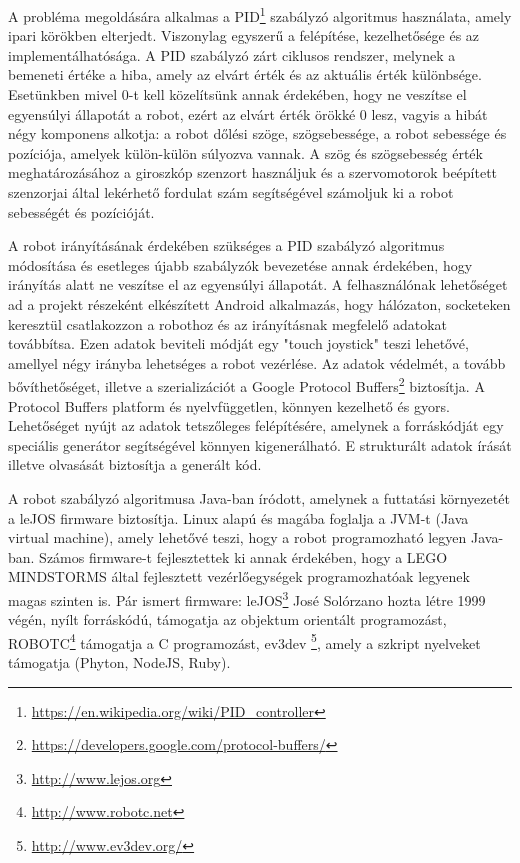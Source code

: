 A probléma megoldására alkalmas a PID\footnote{\href{https://en.wikipedia.org/wiki/PID\_controller}{https://en.wikipedia.org/wiki/PID\_controller}} szabályzó algoritmus használata, amely ipari körökben elterjedt. Viszonylag egyszerű a felépítése, kezelhetősége és az implementálhatósága. A PID szabályzó zárt ciklusos rendszer, melynek a bemeneti értéke a hiba, amely az elvárt érték és az aktuális érték különbsége. Esetünkben mivel 0-t kell közelítsünk annak érdekében, hogy ne veszítse el egyensúlyi állapotát a robot, ezért az elvárt érték örökké 0 lesz, vagyis a hibát négy komponens alkotja: a robot dőlési szöge, szögsebessége, a robot sebessége és pozíciója, amelyek külön-külön súlyozva vannak. A szög és szögsebesség érték meghatározásához a giroszkóp szenzort használjuk és a szervomotorok beépített szenzorjai által lekérhető fordulat szám segítségével számoljuk ki a robot sebességét és pozícióját.

A robot irányításának érdekében szükséges a PID szabályzó algoritmus módosítása és esetleges újabb szabályzók bevezetése annak érdekében, hogy irányítás alatt ne veszítse el az egyensúlyi állapotát. A felhasználónak lehetőséget ad a projekt részeként elkészített Android alkalmazás, hogy hálózaton, socketeken keresztül csatlakozzon a robothoz és az irányításnak megfelelő adatokat továbbítsa. Ezen adatok beviteli módját egy "touch joystick" teszi lehetővé, amellyel négy irányba lehetséges a robot vezérlése. Az adatok védelmét, a tovább bővíthetőséget, illetve a szerializációt a Google Protocol Buffers\footnote{\href {https://developers.google.com/protocol-buffers/}{https://developers.google.com/protocol-buffers/}} biztosítja. A Protocol Buffers platform és nyelvfüggetlen, könnyen kezelhető és gyors. Lehetőséget nyújt az adatok tetszőleges felépítésére, amelynek a forráskódját egy speciális generátor segítségével könnyen kigenerálható. E strukturált adatok írását illetve olvasását biztosítja a generált kód.

A robot szabályzó algoritmusa Java-ban íródott, amelynek a futtatási környezetét a leJOS firmware biztosítja. Linux alapú  és magába foglalja a JVM-t (Java virtual machine), amely lehetővé teszi, hogy a robot programozható legyen Java-ban. Számos firmware-t fejlesztettek ki annak érdekében, hogy a LEGO MINDSTORMS által fejlesztett vezérlőegységek programozhatóak legyenek magas szinten is. Pár ismert firmware: leJOS\footnote{\href{http://www.lejos.org}{http://www.lejos.org}} José Solórzano hozta létre 1999 végén, nyílt forráskódú, támogatja az objektum orientált programozást, ROBOTC\footnote{\href {http://www.robotc.net}{http://www.robotc.net}} támogatja a C programozást, ev3dev \footnote{\href{http://www.ev3dev.org/}{http://www.ev3dev.org/}}, amely a szkript nyelveket támogatja (Phyton, NodeJS, Ruby). 

